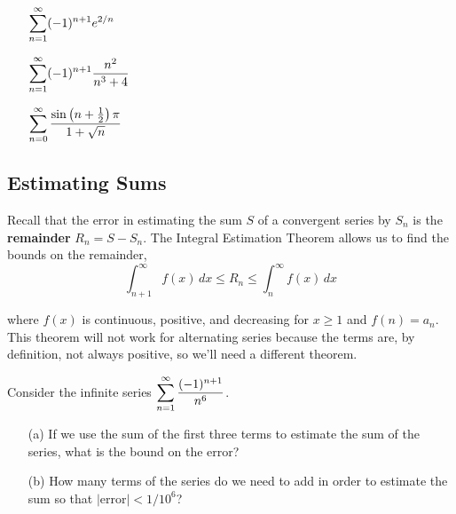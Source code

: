 \documentclass[12pt]{article}
\begin{document}
\ExamplesCont

\begin{itemize}
\item[\tc{2}] $\displaystyle\sum_{n=1}^\infty(-1)^{n+1}e^{2/n}$

\vfill

\item[\tc{3}] $\displaystyle\sum_{n=1}^\infty (-1)^{n+1}\dfrac{n^2}{n^3+4}$

\vfill

\end{itemize}

\newpage

\ExamplesCont

\begin{itemize}
\item[\tc{4}] $\displaystyle\sum_{n=0}^\infty \dfrac{\sin\left(n+\frac{1}{2}\right)\pi}{1+\sqrt{n}}$
\end{itemize}

\vfill

\subsection*{Estimating Sums}

Recall that the error in estimating the sum $S$ of a convergent series by $S_n$ is the \textbf{remainder} $R_n=S-S_n$. The Integral Estimation Theorem allows us to find the bounds on the remainder,
$$\int_{n+1}^\infty f(x)\,dx\leq R_n\leq \int_n^\infty f(x)\,dx$$

where $f(x)$ is continuous, positive, and decreasing for $x\geq 1$ and $f(n)=a_n$. This theorem will not work for alternating series because the terms are, by definition, not always positive, so we'll need a different theorem.

\vspace{4mm}


\vspace{30mm}

\newpage

\Example Consider the infinite series $\displaystyle\sum_{n=1}^\infty\dfrac{(-1)^{n+1}}{n^6}$.

\begin{enumerate}
\item[(a)] If we use the sum of the first three terms to estimate the sum of the series, what is the bound on the error?

\vfill

\item[(b)] How many terms of the series do we need to add in order to estimate the sum so that $\big|$error$\big|<1/10^6$?

\vfill
\end{enumerate}
\end{document}
